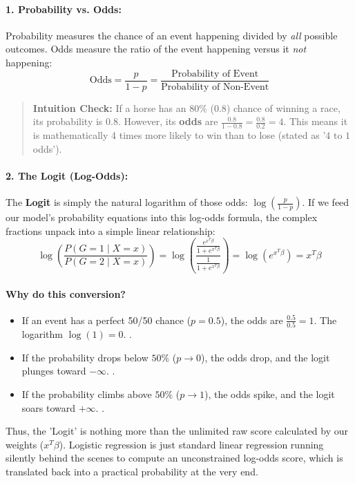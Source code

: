 \documentclass{article}
\begin{document}
\paragraph{1. Probability vs. Odds:} 
Probability measures the chance of an event happening divided by \textit{all} possible outcomes. Odds measure the ratio of the event happening versus it \textit{not} happening:
\[ \text{Odds} = \frac{p}{1-p} = \frac{\text{Probability of Event}}{\text{Probability of Non-Event}} \]
\begin{quote}
  \textbf{Intuition Check:} If a horse has an $80\%$ ($0.8$) chance of winning a race, its probability is $0.8$. However, its \textbf{odds} are $\frac{0.8}{1 - 0.8} = \frac{0.8}{0.2} = 4$. This means it is mathematically 4 times more likely to win than to lose (stated as '$4 \text{ to } 1$ odds').
\end{quote}

\paragraph{2. The Logit (Log-Odds):}
The \textbf{Logit} is simply the natural logarithm of those odds: $\log\left(\frac{p}{1-p}\right)$. If we feed our model's probability equations into this log-odds formula, the complex fractions unpack into a simple linear relationship:
\[ \log \left( \frac{P(G=1 \mid X = x)}{P(G=2 \mid X = x)} \right) = \log\left( \frac{\frac{e^{x^T\beta}}{1+e^{x^T\beta}}}{\frac{1}{1+e^{x^T\beta}}} \right) = \log\left(e^{x^T\beta}\right) = x^T\beta \]

\paragraph{Why do this conversion?} 
\begin{itemize}
  \item If an event has a perfect 50/50 chance ($p = 0.5$), the odds are $\frac{0.5}{0.5} = 1$. The logarithm $\log(1) = 0$.
  .
  \item If the probability drops below $50\%$ ($p \to 0$), the odds drop, and the logit plunges toward $-\infty$.
  .
  \item If the probability climbs above $50\%$ ($p \to 1$), the odds spike, and the logit soars toward $+\infty$.
  .
\end{itemize}
Thus, the 'Logit' is nothing more than the unlimited raw score calculated by our weights ($x^T\beta$). Logistic regression is just standard linear regression running silently behind the scenes to compute an unconstrained log-odds score, which is translated back into a practical probability at the very end.
\end{document}

